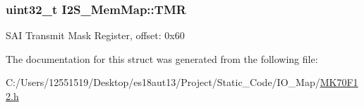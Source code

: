 \subsubsection[{T\+M\+R}]{\setlength{\rightskip}{0pt plus 5cm}uint32\+\_\+t I2\+S\+\_\+\+Mem\+Map\+::\+T\+M\+R}\label{struct_i2_s___mem_map_a52b2dd69044a5f8c990749c314664ae1}
S\+A\+I Transmit Mask Register, offset\+: 0x60 

The documentation for this struct was generated from the following file\+:\begin{DoxyCompactItemize}
\item 
C\+:/\+Users/12551519/\+Desktop/es18aut13/\+Project/\+Static\+\_\+\+Code/\+I\+O\+\_\+\+Map/\hyperlink{_m_k70_f12_8h}{M\+K70\+F12.\+h}\end{DoxyCompactItemize}
